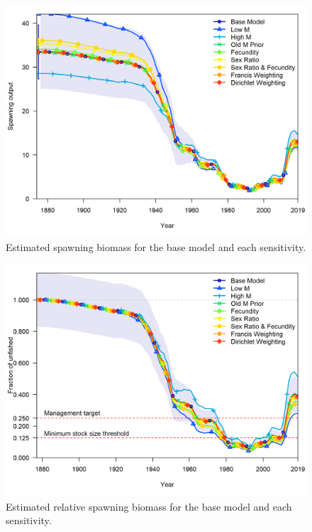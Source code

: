 \documentclass[12pt,]{article}
\begin{document}
\FloatBarrier

\begin{figure}
\centering
\includegraphics{Figures/ssb_sens.png}
\caption{Estimated spawning biomass for the base model and each
sensitivity. \label{fig:sens_ssb}}
\end{figure}

\FloatBarrier

\begin{figure}
\centering
\includegraphics{Figures/depl_sens.png}
\caption{Estimated relative spawning biomass for the base model and each
sensitivity. \label{fig:sens_depl}}
\end{figure}
\end{document}
